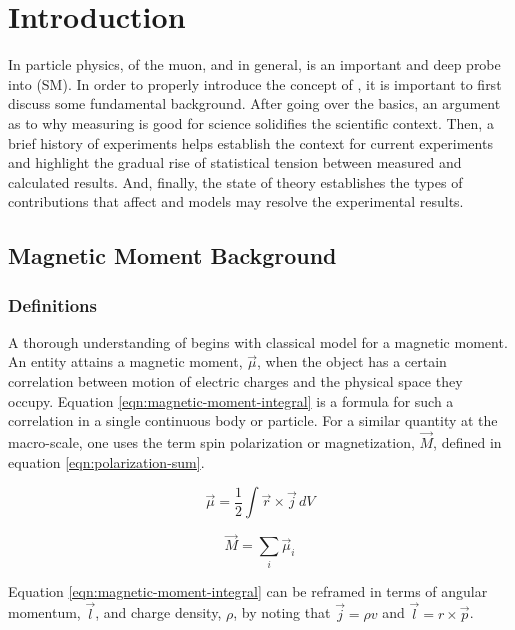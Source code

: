 \chapter {Introduction} \label{ch:intro}

In particle physics, \gmtwo of the muon, and \gmtwo in general, is an important and deep probe into \tsm (SM). In order to properly introduce the concept of \gmtwo, it is important to first discuss some fundamental background.  After going over the basics, an argument as to why measuring \mugmtwo is good for science solidifies the scientific context. Then, a brief history of \mugmtwo experiments helps establish the context for current \mugmtwo experiments and highlight the gradual rise of statistical tension between measured and calculated results.  And, finally, the state of theory establishes the types of contributions that affect \mugmtwo and models may resolve the experimental results. 

\section{Magnetic Moment Background}

\subsection{Definitions}
A thorough understanding of \gmtwo begins with classical model for a magnetic moment.  An entity attains a magnetic moment, $\vec{\mu}$, when the object has a certain correlation between motion of electric charges and the physical space they occupy.  Equation \ref{eqn:magnetic-moment-integral} is a formula for such a correlation in a single continuous body or particle\cite{jackson}.  For a similar quantity at the macro-scale, one uses the term spin polarization or magnetization, $\vec{M}$, defined in equation \ref{eqn:polarization-sum}.

\begin{equation}
\label{eqn:magnetic-moment-integral}
\vec{\mu} = \frac{1}{2} \int \vec{r} \times \vec{j} \,dV
\end{equation}

\begin{equation}
\label{eqn:polarization-sum}
\vec{M} = \sum_i \vec{\mu}_i
\end{equation}

\noindent
Equation \ref{eqn:magnetic-moment-integral} can be reframed in terms of angular momentum, $\vec{l}$, and charge density, $
\rho$, by noting that $\vec{j} = \rho v$ and $\vec{l} = r \times \vec{p}$.

